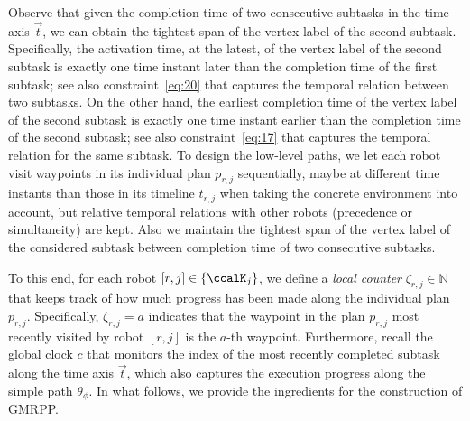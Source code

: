 \documentclass[Afour,sageh,times]{sagej}
\newcommand{\auto}[1]{\ccalA_{\textup{#1}}}
\newcommand{\autop}{\ccalA_{\phi}}
\newcommand{\domanda}[1]{\subsubsection*{#1}}
\begin{document}
{{ {Observe that given the completion time of two consecutive subtasks in the time axis $\vec{t}$, we can obtain the tightest span of the vertex label of the second subtask. Specifically, the activation time, at the latest, of the vertex label of the second subtask is exactly one time instant later than the completion time of the first subtask; see also constraint~\eqref{eq:20} that captures the temporal relation between two subtasks. On the other hand, the earliest completion time of the vertex label of the second subtask is exactly one time instant earlier than the completion time of the second subtask; see also constraint~\eqref{eq:17} that captures the temporal relation for the same subtask.  To design the low-level paths,  we let each robot visit waypoints in its individual plan $p_{r,j}$ sequentially, maybe at different time instants than those in its timeline $t_{r,j}$ when taking the concrete environment into account, but relative temporal relations with other robots (precedence or simultaneity) are kept. Also we maintain the tightest span of the vertex label of the considered subtask between completion time of two consecutive subtasks.}

 To this end, for each robot $[r,j] \in \{\ccalK_j\}$, we define a {\it local counter} $\zeta_{r,j} \in \mathbb{N}$  that  keeps track of how much progress has been made along the individual plan $p_{r,j}$. Specifically, $\zeta_{r,j} = a$ indicates that the waypoint in the plan $p_{r,j}$ most recently visited by  robot $[r,j]$ is the $a$-th waypoint. Furthermore, recall the  global clock $c$ that monitors the index of the most recently completed subtask  along the time axis $\vec{t}$, which also captures the execution progress along the simple path  $\theta_{\phi}$. In what follows, we provide the ingredients for the construction of GMRPP.


}}
\end{document}

